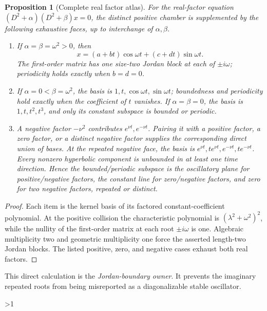 \documentclass[10pt]{article}
\newtheorem{proposition}{Proposition}
\providecommand{\CRevisionRound}{2}
\begin{document}
\begin{proposition}[Complete real factor atlas]
For the real-factor equation \((D^2+\alpha)(D^2+\beta)x=0\), the distinct
positive chamber is supplemented by the following exhaustive faces, up to
interchange of \(\alpha,\beta\).
\begin{enumerate}
\item If \(\alpha=\beta=\omega^2>0\), then
\begin{equation}
x=(a+bt)\cos\omega t+(c+dt)\sin\omega t.
\end{equation}
The first-order matrix has one size-two Jordan block at each of
\(\pm i\omega\); periodicity holds exactly when \(b=d=0\).
\item If \(\alpha=0<\beta=\omega^2\), the basis is
\(1,t,\cos\omega t,\sin\omega t\); boundedness and periodicity hold exactly
when the coefficient of \(t\) vanishes.  If \(\alpha=\beta=0\), the basis is
\(1,t,t^2,t^3\), and only its constant subspace is bounded or periodic.
\item A negative factor \(-\nu^2\) contributes
\(e^{\nu t},e^{-\nu t}\).  Pairing it with a positive factor, a zero factor,
or a distinct negative factor supplies the corresponding direct union of
bases.  At the repeated negative face, the basis is
\(e^{\nu t},te^{\nu t},e^{-\nu t},te^{-\nu t}\).
Every nonzero hyperbolic component is unbounded in at least one time
direction.  Hence the bounded/periodic subspace is the oscillatory plane for
positive/negative factors, the constant line for zero/negative factors, and
zero for two negative factors, repeated or distinct.
\end{enumerate}
\end{proposition}

\begin{proof}
Each item is the kernel basis of its factored constant-coefficient
polynomial.  At the positive collision the characteristic polynomial is
\((\lambda^2+\omega^2)^2\), while the nullity of the first-order matrix at
each root \(\pm i\omega\) is one.  Algebraic multiplicity two and geometric
multiplicity one force the asserted length-two Jordan blocks.  The listed
positive, zero, and negative cases exhaust both real factors.
\end{proof}

This direct calculation is the \emph{Jordan-boundary owner}.  It prevents the
imaginary repeated roots from being misreported as a diagonalizable stable
oscillator.
\fi

\ifnum\CRevisionRound>1
\end{document}
